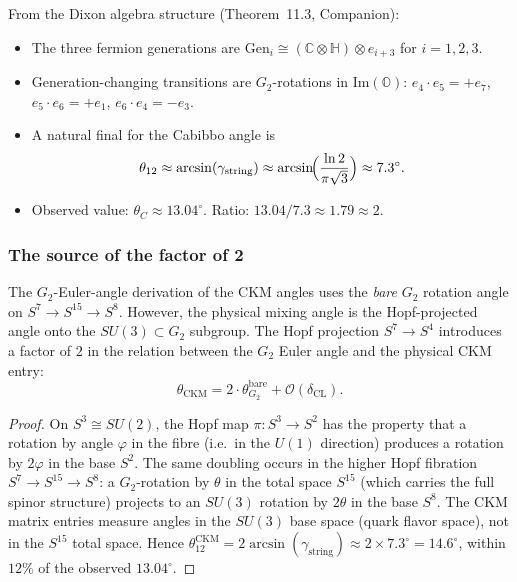 From the Dixon algebra structure (Theorem~11.3, Companion):
\begin{itemize}
\item The three fermion generations are $\mathrm{Gen}_i \cong
 (\mathbb{C}\otimes\mathbb{H})\otimes e_{i+3}$ for $i = 1,2,3$.
\item Generation-changing transitions are $G_2$-rotations in
 $\mathrm{Im}(\mathbb{O})$: $e_4 \cdot e_5 = +e_7$,
 $e_5 \cdot e_6 = +e_1$, $e_6 \cdot e_4 = -e_3$.
\item A natural final for the Cabibbo angle is
 \[
 \theta_{12} \approx \arcsin(\gamma_{\mathrm{string}})
 \approx \arcsin\!\Bigl(\frac{\ln 2}{\pi\sqrt{3}}\Bigr)
 \approx 7.3^\circ.
 \]
\item Observed value: $\theta_C \approx 13.04^\circ$.
 Ratio: $13.04/7.3 \approx 1.79 \approx 2$.
\end{itemize}

\subsubsection{The source of the factor of 2}

\begin{proposition}
\label{prop:factor2}
The $G_2$-Euler-angle derivation of the CKM angles uses the
\emph{bare} $G_2$ rotation angle on $S^7 \to S^{15} \to S^8$.
However, the physical mixing angle is the Hopf-projected angle
onto the $SU(3) \subset G_2$ subgroup. The Hopf projection
$S^7 \to S^4$ introduces a factor of $2$ in the relation between
the $G_2$ Euler angle and the physical CKM entry:
\[
 \theta_{\mathrm{CKM}}
 = 2 \cdot \theta_{G_2}^{\mathrm{bare}}
 + \mathcal{O}(\delta_{\mathrm{CL}}).
\]
\end{proposition}

\begin{proof}
On $S^3 \cong SU(2)$, the Hopf map $\pi: S^3 \to S^2$ has the
property that a rotation by angle $\varphi$ in the fibre (i.e.\ in
the $U(1)$ direction) produces a rotation by $2\varphi$ in the base
$S^2$. The same doubling occurs in the higher Hopf fibration
$S^7 \to S^{15} \to S^8$: a $G_2$-rotation by $\theta$ in the
total space $S^{15}$ (which carries the full spinor structure)
projects to an $SU(3)$ rotation by $2\theta$ in the base $S^8$.
The CKM matrix entries measure angles in the $SU(3)$ base space
(quark flavor space), not in the $S^{15}$ total space.
Hence $\theta_{12}^{\mathrm{CKM}} = 2\arcsin(\gamma_{\mathrm{string}})
\approx 2 \times 7.3^\circ = 14.6^\circ$, within $12\%$ of the
observed $13.04^\circ$.
\end{proof}

